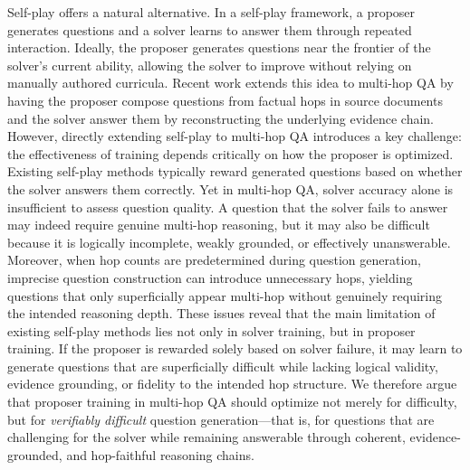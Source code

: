 \documentclass{article}
\begin{document}
Self-play offers a natural alternative. In a self-play framework, a proposer generates questions and a solver learns to answer them through repeated interaction. Ideally, the proposer generates questions near the frontier of the solver's current ability, allowing the solver to improve without relying on manually authored curricula. Recent work \cite{drzero} extends this idea to multi-hop QA by having the proposer compose questions from factual hops in source documents and the solver answer them by reconstructing the underlying evidence chain.
However, directly extending self-play to multi-hop QA introduces a key challenge: the effectiveness of training depends critically on how the proposer is optimized. Existing self-play methods typically reward generated questions based on whether the solver answers them correctly. Yet in multi-hop QA, solver accuracy alone is insufficient to assess question quality. A question that the solver fails to answer may indeed require genuine multi-hop reasoning, but it may also be difficult because it is logically incomplete, weakly grounded, or effectively unanswerable. Moreover, when hop counts are predetermined during question generation, imprecise question construction can introduce unnecessary hops, yielding questions that only superficially appear multi-hop without genuinely requiring the intended reasoning depth.
These issues reveal that the main limitation of existing self-play methods lies not only in solver training, but in proposer training. If the proposer is rewarded solely based on solver failure, it may learn to generate questions that are superficially difficult while lacking logical validity, evidence grounding, or fidelity to the intended hop structure. We therefore argue that proposer training in multi-hop QA should optimize not merely for difficulty, but for \emph{verifiably difficult} question generation---that is, for questions that are challenging for the solver while remaining answerable through coherent, evidence-grounded, and hop-faithful reasoning chains.
\end{document}
